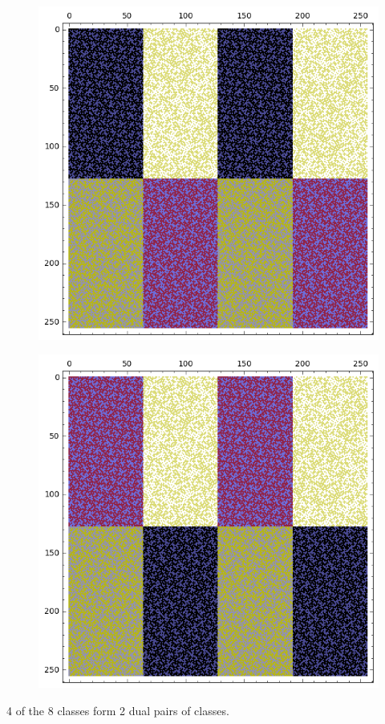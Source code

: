 \documentclass[12pt,a4paper]{article}
\begin{document}
\begin{figure}[!bhpt] %
\centering
\begin{minipage}{.48\textwidth}
  \centering
  \includegraphics[width=.9\linewidth]{../matrix_plot/re8_9_bent_cayley_graph_index_matrix.png}
  \label{fig:c8_9_bent_cayley_graph_index_matrix}
\end{minipage}
\begin{minipage}{.48\textwidth}
  \centering
  \includegraphics[width=.9\linewidth]{../matrix_plot/re8_9_dual_cayley_graph_index_matrix.png}
  \label{fig:c8_9_dual_cayley_graph_index_matrix}
\end{minipage}%
\end{figure}
4 of the 8 classes form 2 dual pairs of classes.
\end{document}
